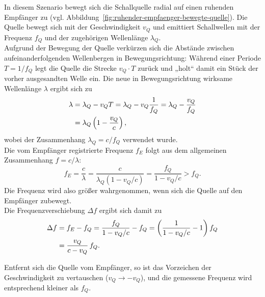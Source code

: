 \documentclass[
	german,%
	accentcolor=3d,%
	type=intern, %
	marginpar=false,%
]{tudapub}
\begin{document}
      In diesem Szenario bewegt sich die Schallquelle radial auf einen ruhenden Empfänger zu (vgl. Abbildung~\ref{fig:ruhender-empfaenger-bewegte-quelle}). Die Quelle bewegt sich mit der Geschwindigkeit \(v_Q\) und emittiert Schallwellen mit der Frequenz \(f_Q\) und der zugehörigen Wellenlänge \(\lambda_Q\).
      \\
      Aufgrund der Bewegung der Quelle verkürzen sich die Abstände zwischen aufeinanderfolgenden Wellenbergen in Bewegungsrichtung: Während einer Periode
      \(
         T = 1/f_Q
      \)
      legt die Quelle die Strecke \(v_Q \cdot T\) zurück und „holt“ damit ein Stück der vorher ausgesandten Welle ein. Die neue in Bewegungsrichtung wirksame Wellenlänge \(\lambda\) ergibt sich zu
      \begin{align}
         \lambda 
            &= \lambda_Q - v_Q T 
            = \lambda_Q - v_Q \frac{1}{f_Q} 
            = \lambda_Q - \frac{v_Q}{f_Q} \notag \\
            &= \lambda_Q \left( 1 - \frac{v_Q}{c} \right),
         \label{eq:doppler-lambda-quelle}
      \end{align}
      wobei der Zusammenhang \(\lambda_Q = c/f_Q\) verwendet wurde.
      \\
      Die vom Empfänger registrierte Frequenz \(f_E\) folgt aus dem allgemeinen Zusammenhang \(f = c/\lambda\):
      \begin{equation}
         f_E = \frac{c}{\lambda}
            = \frac{c}{\lambda_Q (1 - v_Q/c)}
            = \frac{f_Q}{1 - v_Q/c}
            > f_Q .
         \label{eq:doppler-fE-quelle}
      \end{equation}
      Die Frequenz wird also größer wahrgenommen, wenn sich die Quelle auf den Empfänger zubewegt.
      \\
      Die Frequenzverschiebung \(\Delta f\) ergibt sich damit zu
      \begin{align}
         \Delta f 
            &= f_E - f_Q
            = \frac{f_Q}{1 - v_Q/c} - f_Q
            = \left( \frac{1}{1 - v_Q/c} - 1 \right) f_Q \notag \\
            &= \frac{v_Q}{c - v_Q}\, f_Q .
         \label{eq:doppler-deltaf-quelle}
      \end{align}

      Entfernt sich die Quelle vom Empfänger, so ist das Vorzeichen der Geschwindigkeit zu vertauschen (\(v_Q \rightarrow -v_Q\)), und die gemessene Frequenz wird entsprechend kleiner als \(f_Q\).
\end{document}
